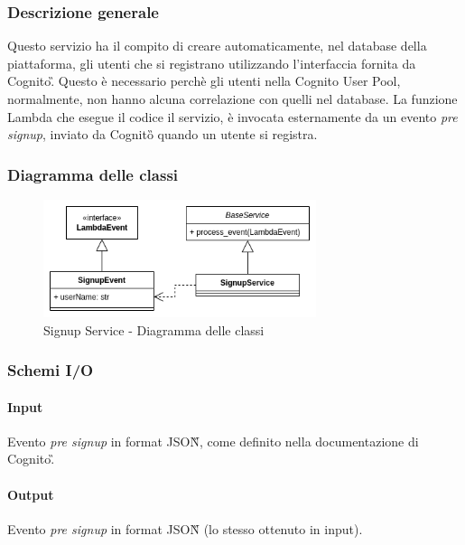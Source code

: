 \subsubsection{Descrizione generale}
Questo servizio ha il compito di creare automaticamente, nel database della piattaforma, gli utenti che
si registrano utilizzando l'interfaccia fornita da Cognito\G. Questo è necessario perchè gli utenti nella
Cognito User Pool, normalmente, non hanno alcuna correlazione con quelli nel database.
La funzione Lambda che esegue il codice il servizio, è invocata esternamente da un evento \textit{pre signup},
inviato da Cognito\G{} quando un utente si registra.

\subsubsection{Diagramma delle classi}
\begin{figure}[H]
    \includegraphics[width=8cm]{sezioni/images/cd_signup.png}
    \centering
    \caption{Signup Service - Diagramma delle classi}
\end{figure}

\subsubsection{Schemi I/O}
\paragraph*{Input}\aCapo{}
Evento \textit{pre signup} in format JSON\G{}, come definito nella documentazione di Cognito\G.

\paragraph*{Output}\aCapo{}
Evento \textit{pre signup} in format JSON\G{} (lo stesso ottenuto in input).
